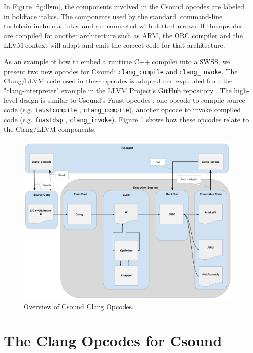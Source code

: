 \documentclass[letterpaper, 12pt]{article}
\begin{document}
In Figure \ref{fig:llvm}, the components involved in the Csound opcodes are labeled in boldface italics. The components used by the standard, command-line toolchain include a linker and are connected with dotted arrows. If the opcodes are compiled for another architecture such as ARM, the ORC compiler and the LLVM context will adapt and emit the correct code for that architecture.

As an example of how to embed a runtime C++ compiler into a SWSS, we present two new opcodes for Csound: \texttt{clang\_compile} and \texttt{clang\_invoke}. The Clang/LLVM code used in these opcodes is adapted and expanded from the "clang-interpreter" example in the LLVM Project's GitHub repository \citep{clanginterpreter}. The high-level design is similar to Csound's Faust opcodes \citep{Lazzarini2014}: one opcode to compile source code (e.g. \texttt{faustcompile} \citep{faustcompile}, \texttt{clang\_compile}), another opcode to invoke compiled code (e.g. \texttt{fuastdsp} \citep{faustdsp}, \texttt{clang\_invoke}). Figure \ref{fig:clangopcodes} shows how these opcodes relate to the Clang/LLVM components.

\begin{figure}[]
\begin{center}
\includegraphics[width=\textwidth,height=\textheight,keepaspectratio]{EmbeddedCLangLLVMArchitecture}\caption{Overview of Csound Clang Opcodes.}
\label{fig:clangopcodes}
\end{center}
\end{figure}

\section{The Clang Opcodes for Csound}
\end{document}

